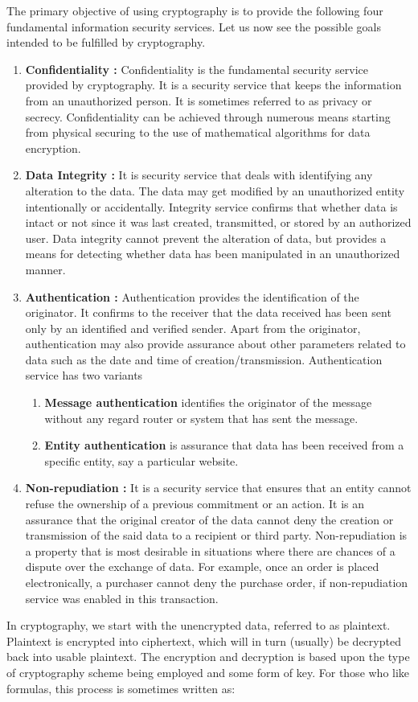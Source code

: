 \documentclass[british]{article}
\begin{document}
The primary objective of using cryptography is to provide the following
four fundamental information security services. Let us now see the
possible goals intended to be fulfilled by cryptography.
\begin{enumerate}
\item \textbf{Confidentiality : }Confidentiality is the fundamental security
service provided by cryptography. It is a security service that keeps
the information from an unauthorized person. It is sometimes referred
to as privacy or secrecy. Confidentiality can be achieved through
numerous means starting from physical securing to the use of mathematical
algorithms for data encryption.
\item \textbf{Data Integrity :} It is security service that deals with identifying
any alteration to the data. The data may get modified by an unauthorized
entity intentionally or accidentally. Integrity service confirms that
whether data is intact or not since it was last created, transmitted,
or stored by an authorized user. Data integrity cannot prevent the
alteration of data, but provides a means for detecting whether data
has been manipulated in an unauthorized manner.
\item \textbf{Authentication : }Authentication provides the identification
of the originator. It confirms to the receiver that the data received
has been sent only by an identified and verified sender. Apart from
the originator, authentication may also provide assurance about other
parameters related to data such as the date and time of creation/transmission.
Authentication service has two variants \textminus{}
\begin{enumerate}
\item \textbf{Message authentication} identifies the originator of the message
without any regard router or system that has sent the message.
\item \textbf{Entity authentication} is assurance that data has been received
from a specific entity, say a particular website.
\end{enumerate}
\item \textbf{Non-repudiation : }It is a security service that ensures that
an entity cannot refuse the ownership of a previous commitment or
an action. It is an assurance that the original creator of the data
cannot deny the creation or transmission of the said data to a recipient
or third party. Non-repudiation is a property that is most desirable
in situations where there are chances of a dispute over the exchange
of data. For example, once an order is placed electronically, a purchaser
cannot deny the purchase order, if non-repudiation service was enabled
in this transaction.
\end{enumerate}
In cryptography, we start with the unencrypted data, referred to as
plaintext. Plaintext is encrypted into ciphertext, which will in turn
(usually) be decrypted back into usable plaintext. The encryption
and decryption is based upon the type of cryptography scheme being
employed and some form of key. For those who like formulas, this process
is sometimes written as:
\end{document}
